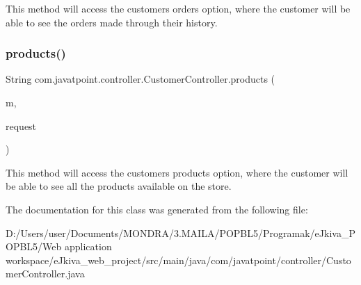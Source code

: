 This method will access the customer\textquotesingle{}s \textquotesingle{}orders\textquotesingle{} option, where the customer will be able to see the orders made through their history. \mbox{\label{classcom_1_1javatpoint_1_1controller_1_1_customer_controller_a5d32bdd124f745fc2ad718610786f638}} 
\subsubsection{\texorpdfstring{products()}{products()}}
{\footnotesize\ttfamily String com.\+javatpoint.\+controller.\+Customer\+Controller.\+products (\begin{DoxyParamCaption}\item[{Model}]{m,  }\item[{Web\+Request}]{request }\end{DoxyParamCaption})\hspace{0.3cm}{\ttfamily [inline]}}

This method will access the customer\textquotesingle{}s \textquotesingle{}products\textquotesingle{} option, where the customer will be able to see all the products available on the store. 

The documentation for this class was generated from the following file\+:\begin{DoxyCompactItemize}
\item 
D\+:/\+Users/user/\+Documents/\+M\+O\+N\+D\+R\+A/3.\+M\+A\+I\+L\+A/\+P\+O\+P\+B\+L5/\+Programak/e\+Jkiva\+\_\+\+P\+O\+P\+B\+L5/\+Web application workspace/e\+Jkiva\+\_\+web\+\_\+project/src/main/java/com/javatpoint/controller/Customer\+Controller.\+java\end{DoxyCompactItemize}
